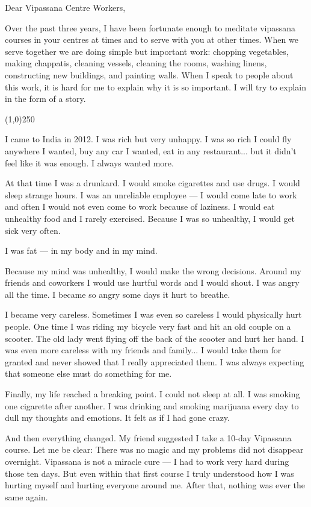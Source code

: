 \documentclass{article}
\begin{document}
Dear Vipassana Centre Workers,

Over the past three years, I have been fortunate enough to meditate vipassana courses
in your centres at times and to serve with you at other times. When we serve together
we are doing simple but important work: chopping vegetables, making chappatis,
cleaning vessels, cleaning the rooms, washing linens, constructing new buildings, and
painting walls. When I speak to people about this work, it is hard for me to explain
why it is so important. I will try to explain in the form of a story.

\begin{center}
\line(1,0){250}
\end{center}

I came to India in 2012. I was rich but very unhappy. I was so rich I could fly
anywhere I wanted, buy any car I wanted, eat in any restaurant... but it didn't feel
like it was enough. I always wanted more.

At that time I was a drunkard. I would smoke cigarettes and
use drugs. I would sleep strange hours. I was an unreliable employee --- I would come
late to work and often I would not even come to work because of laziness. I would eat
unhealthy food and I rarely exercised. Because I was so unhealthy, I would get sick
very often.

I was fat --- in my body and in my mind.

Because my mind was unhealthy, I would make the wrong decisions. Around my friends
and coworkers I would use hurtful words and I would shout. I was angry all the
time. I became so angry some days it hurt to breathe.

I became very careless. Sometimes I was even so careless I would physically hurt
people. One time I was riding my bicycle very fast and hit an old couple on a
scooter. The old lady went flying off the back of the scooter and hurt her hand. I
was even more careless with my friends and family... I would take them for granted
and never showed that I really appreciated them. I was always expecting that someone
else must do something for me.

Finally, my life reached a breaking point. I could not sleep at all. I was smoking
one cigarette after another. I was drinking and smoking marijuana every day to dull
my thoughts and emotions. It felt as if I had gone crazy.

And then everything changed. My friend suggested I take a 10-day Vipassana
course. Let me be clear: There was no magic and my problems did not disappear
overnight. Vipassana is not a miracle cure --- I had to work very hard during those
ten days. But even within that first course I truly understood how I was hurting myself
and hurting everyone around me. After that, nothing was ever the same again.
\end{document}
